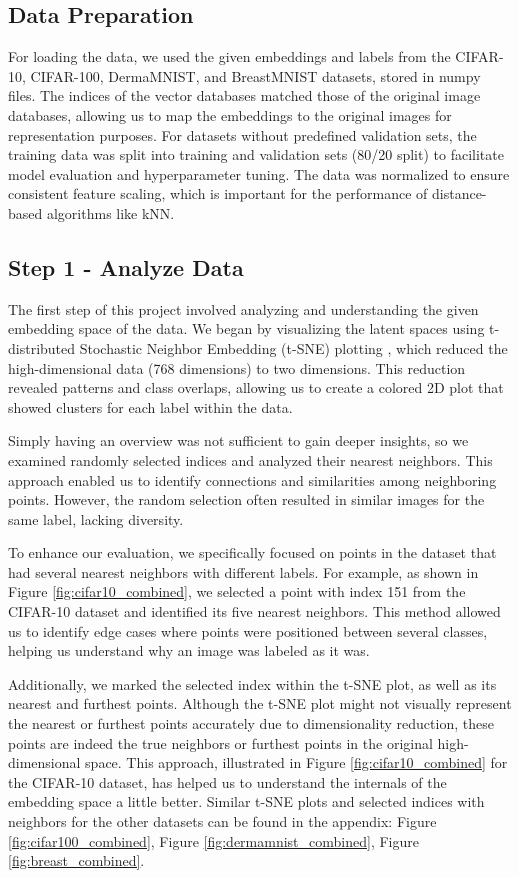 \documentclass[a4paper]{article}
\begin{document}
\subsection{Data Preparation}
For loading the data, we used the given embeddings and labels from the CIFAR-10, CIFAR-100, DermaMNIST, and BreastMNIST datasets, stored in numpy files. The indices of the vector databases matched those of the original image databases, allowing us to map the embeddings to the original images for representation purposes. For datasets without predefined validation sets, the training data was split into training and validation sets (80/20 split) to facilitate model evaluation and hyperparameter tuning. The data was normalized to ensure consistent feature scaling, which is important for the performance of distance-based algorithms like kNN\@.


\subsection{Step 1 - Analyze Data}
The first step of this project involved analyzing and understanding the given embedding space of the data. We began by visualizing the latent spaces using t-distributed Stochastic Neighbor Embedding (t-SNE) plotting \citep{Maaten2008}, which reduced the high-dimensional data (768 dimensions) to two dimensions. This reduction revealed patterns and class overlaps, allowing us to create a colored 2D plot that showed clusters for each label within the data.

Simply having an overview was not sufficient to gain deeper insights, so we examined randomly selected indices and analyzed their nearest neighbors. This approach enabled us to identify connections and similarities among neighboring points. However, the random selection often resulted in similar images for the same label, lacking diversity.

To enhance our evaluation, we specifically focused on points in the dataset that had several nearest neighbors with different labels. For example, as shown in Figure \ref{fig:cifar10_combined}, we selected a point with index 151 from the CIFAR-10 dataset and identified its five nearest neighbors. This method allowed us to identify edge cases where points were positioned between several classes, helping us understand why an image was labeled as it was.

Additionally, we marked the selected index within the t-SNE plot, as well as its nearest and furthest points. Although the t-SNE plot might not visually represent the nearest or furthest points accurately due to dimensionality reduction, these points are indeed the true neighbors or furthest points in the original high-dimensional space. This approach, illustrated in Figure \ref{fig:cifar10_combined} for the CIFAR-10 dataset, has helped us to understand the internals of the embedding space a little better. Similar t-SNE plots and selected indices with neighbors for the other datasets can be found in the appendix: Figure \ref{fig:cifar100_combined}, Figure \ref{fig:dermamnist_combined}, Figure \ref{fig:breast_combined}.
\end{document}
